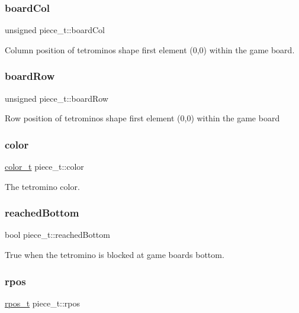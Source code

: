 \subsubsection{\texorpdfstring{board\+Col}{boardCol}}
{\footnotesize\ttfamily unsigned piece\+\_\+t\+::board\+Col}

Column position of tetromino\textquotesingle{}s shape first element (0,0) within the game board. \mbox{\label{structpiece__t_a14640fd68c44e80eacbe6adbf8597829}} 
\subsubsection{\texorpdfstring{board\+Row}{boardRow}}
{\footnotesize\ttfamily unsigned piece\+\_\+t\+::board\+Row}

Row position of tetromino\textquotesingle{}s shape first element (0,0) within the game board \mbox{\label{structpiece__t_af6408bda8899430d6457a83afb657225}} 
\subsubsection{\texorpdfstring{color}{color}}
{\footnotesize\ttfamily \mbox{\hyperlink{TetreesDefs_8hpp_a8ba5fbce2446135735693ab60c896bbd}{color\+\_\+t}} piece\+\_\+t\+::color}

The tetromino color. \mbox{\label{structpiece__t_acb67c9322e157b7dd7c7e0efd212da76}} 
\subsubsection{\texorpdfstring{reached\+Bottom}{reachedBottom}}
{\footnotesize\ttfamily bool piece\+\_\+t\+::reached\+Bottom}

True when the tetromino is blocked at game board\textquotesingle{}s bottom. \mbox{\label{structpiece__t_ab1d715c35231b557560096e2d79f4a43}} 
\subsubsection{\texorpdfstring{rpos}{rpos}}
{\footnotesize\ttfamily \mbox{\hyperlink{TetreesDefs_8hpp_ae8c3bf9765f183eabf1106110513afc6}{rpos\+\_\+t}} piece\+\_\+t\+::rpos}

